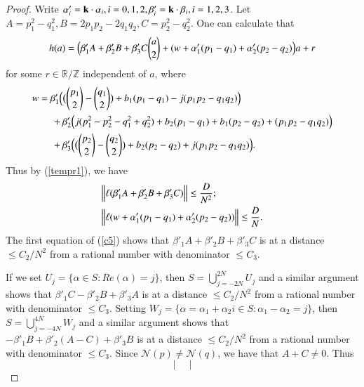 \documentclass[12pt,amstex]{amsart}
\theoremstyle{definition}
\def \A {\alpha}
\def \B {\beta}
\begin{document}
\begin{proof}
Write $\A'_{i}=\bold{k}\cdot\bold{\A}_{i}, i=0,1,2, \B'_{i}=\bold{k}\cdot\bold{\B}_{i}, i=1,2,3$. Let $A=p_{1}^{2}-q_{1}^{2}, B=2p_{1}p_{2}-2q_{1}q_{2}, C=p_{2}^{2}-q_{2}^{2}$. One can calculate that
 \begin{equation}\nonumber
  \begin{split}
    h(a)=\Bigl(\B'_{1}A+\B'_{2}B+\B'_{3}C\binom{a}{2}+(w+\A'_{1}(p_{1}-q_{1})+\A'_{2}(p_{2}-q_{2})\Bigr) a+r
  \end{split}
\end{equation}
for some $r\in\mathbb{R}/\mathbb{Z}$ independent of $a$, where
 \begin{equation}\nonumber
  \begin{split}
    &w=\B'_{1}\Bigl(\bigl(\binom{p_{1}}{2}-\binom{q_{1}}{2}\bigr)+b_{1}(p_{1}-q_{1})-j(p_{1}p_{2}-q_{1}q_{2})\Bigr)
    \\&\qquad+\B'_{2}\Bigl( j(p_{1}^{2}-p_{2}^{2}-q_{1}^{2}+q_{2}^{2})+b_{2}(p_{1}-q_{1})+b_{1}(p_{2}-q_{2})+(p_{1}p_{2}-q_{1}q_{2})\Bigr)
    \\&\qquad+\B'_{3}\Bigl(\bigl(\binom{p_{2}}{2}-\binom{q_{2}}{2}\bigr)+b_{2}(p_{2}-q_{2})+j(p_{1}p_{2}-q_{1}q_{2})\Bigr).
  \end{split}
\end{equation}
Thus by (\ref{tempr1}), we have
 \begin{equation}\label{c5}
  \begin{split}
    &\Bigl\Vert\ell(\B'_{1}A+\B'_{2}B+\B'_{3}C)\Bigr\Vert\leq\frac{D}{N^{2}}; \\&\Bigl\Vert\ell(w+\A'_{1}(p_{1}-q_{1})+\A'_{2}(p_{2}-q_{2}))\Bigr\Vert\leq\frac{D}{N}.
  \end{split}
\end{equation}
The first equation of (\ref{c5}) shows that $\B'_{1}A+\B'_{2}B+\B'_{3}C$ is at a distance $\leq C_{2}/N^{2}$ from a rational number with denominator $\leq C_{3}$.

If we set $U_{j}=\{\A\in S\colon Re(\A)=j\}$, then $S=\bigcup_{j=-2N}^{2N}U_{j}$ and a similar argument shows that $\B'_{1}C-\B'_{2}B+\B'_{3}A$ is at a distance $\leq C_{2}/N^{2}$ from a rational number with denominator $\leq C_{3}$. Setting $W_{j}=\{\A=\A_{1}+\A_{2}i\in S\colon \A_{1}-\A_{2}=j\}$, then $S=\bigcup_{j=-4N}^{4N}W_{j}$ and a similar argument shows that $-\B'_{1}B+\B'_{2}(A-C)+\B'_{3}B$ is at a distance $\leq C_{2}/N^{2}$ from a rational number with denominator $\leq C_{3}$. Since $\mathcal{N}(p)\neq \mathcal{N}(q)$, we have that $A+C\neq 0$. Thus
 \begin{equation}\nonumber
\begin{vmatrix}


\end{vmatrix}
\end{equation}
\end{proof}
\end{document}
